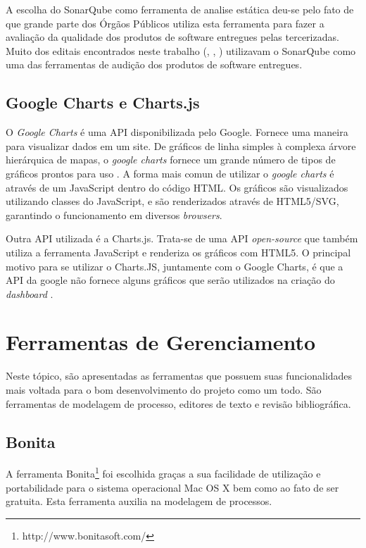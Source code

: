 A escolha do SonarQube como ferramenta de analise estática deu-se pelo fato de que grande parte dos Órgãos Públicos utiliza esta ferramenta para fazer a avaliação da qualidade dos produtos de software entregues pelas tercerizadas. Muito dos editais encontrados neste trabalho (\cite{brazil_2010}, \cite{fernandes_2005}, \cite{edital})  utilizavam o SonarQube como uma das ferramentas de audição dos produtos de software entregues.
	
	\subsection{Google Charts e Charts.js}
	\label{sub:google_charts_chartsjs}
	O \textit{Google Charts} é uma API disponibilizada pelo Google. Fornece uma maneira para visualizar dados em um site. De gráficos de linha simples à complexa árvore hierárquica de mapas, o \textit{google charts} fornece um grande número de tipos de gráficos prontos para uso \cite{google_charts}. A forma mais comun de utilizar o \textit{google charts} é através de um JavaScript dentro do código HTML. Os gráficos são visualizados utilizando classes do JavaScript, e são renderizados através de HTML5/SVG, garantindo o funcionamento em diversos \textit{browsers}. 

Outra API utilizada é a Charts.js. Trata-se de uma API \textit{open-source} que também utiliza a ferramenta JavaScript e renderiza os gráficos com HTML5. O principal motivo para se utilizar o Charts.JS, juntamente com o Google Charts, é que a API da google não fornece alguns gráficos que serão utilizados na criação do \textit{dashboard} \cite{chartsjs}.
	
\section{Ferramentas de Gerenciamento}
Neste tópico, são apresentadas as ferramentas que possuem suas funcionalidades mais voltada para o bom desenvolvimento do projeto como um todo. São ferramentas de modelagem de processo, editores de texto e revisão bibliográfica. 

	\subsection{Bonita} %
	\label{sub:Bonita}
		 A ferramenta Bonita\footnote{http://www.bonitasoft.com/} foi escolhida graças a sua facilidade de utilização e portabilidade para o sistema operacional Mac OS X bem como ao fato de ser gratuita. Esta ferramenta auxilia na modelagem de processos.

